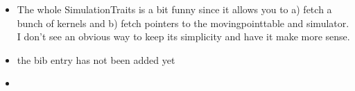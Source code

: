 \begin{itemize}
\item The whole SimulationTraits is a bit funny since it allows you to
a) fetch a bunch of kernels and b) fetch pointers to the
movingpointtable and simulator. I don't see an obvious way to keep its
simplicity and have it make more sense.

\item the bib entry has not been added yet

\item 


\end{itemize}

